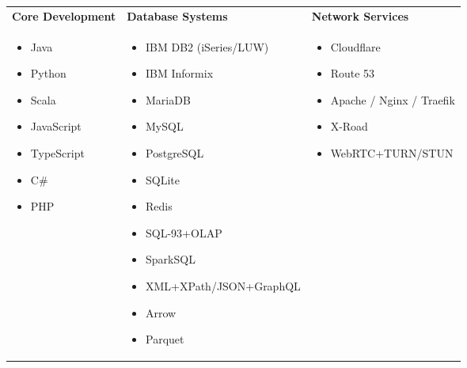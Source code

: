 \documentclass[a4paper,10pt]{article}
\begin{document}
  \begin{tabular}{L{\skillcolwidth}|L{\skillcolwidth}|L{\skillcolwidth}}
  \textbf{Core Development} & 
  \textbf{Database Systems} & 
  \textbf{Network Services} \\
  \begin{itemize}[leftmargin=*]
    \item Java
    \item Python
    \item Scala
    \item JavaScript
    \item TypeScript
    \item C\#
    \item PHP
  \end{itemize} & 
  \begin{itemize}[leftmargin=*]
    \item IBM DB2 (iSeries/LUW)
    \item IBM Informix
    \item MariaDB
    \item MySQL
    \item PostgreSQL
    \item SQLite
    \item Redis
    \item SQL-93+OLAP
    \item SparkSQL
    \item XML+XPath/JSON+GraphQL
    \item Arrow
    \item Parquet
  \end{itemize} & 
  \begin{itemize}[leftmargin=*]
    \item Cloudflare
    \item Route 53
    \item Apache / Nginx / Traefik
    \item X-Road
    \item WebRTC+TURN/STUN
  \end{itemize} \\
  \hline
  

\end{tabular}
\end{document}
